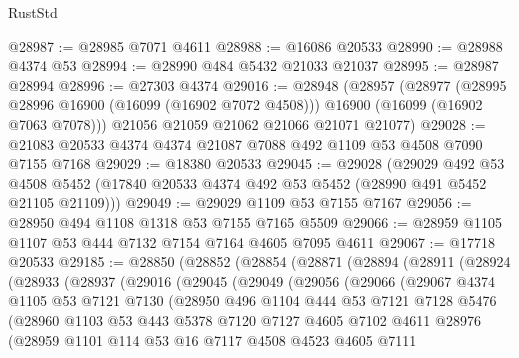 \begin{lexlean}{RustStd}
\begin{coremodule}
@28987 := @28985 @7071 @4611
@28988 := @16086 @20533
@28990 := @28988 @4374 @53
@28994 := @28990 @484 @5432 @21033 @21037
@28995 := @28987 @28994
@28996 := @27303 @4374
@29016 := @28948
    (@28957
      (@28977
        (@28995 @28996 @16900 (@16099 (@16902 @7072 @4508)))
        @16900
        (@16099 (@16902 @7063 @7078)))
      @21056
      @21059
      @21062
      @21066
      @21071
      @21077)
@29028 := @21083 @20533 @4374 @4374 @21087 @7088 @492 @1109 @53 @4508 @7090 @7155 @7168
@29029 := @18380 @20533
@29045 := @29028
    (@29029
      @492
      @53
      @4508
      @5452
      (@17840 @20533 @4374 @492 @53 @5452 (@28990 @491 @5452 @21105 @21109)))
@29049 := @29029 @1109 @53 @7155 @7167
@29056 := @28950 @494 @1108 @1318 @53 @7155 @7165 @5509
@29066 := @28959 @1105 @1107 @53 @444 @7132 @7154 @7164 @4605 @7095 @4611
@29067 := @17718 @20533
@29185 := @28850
    (@28852
      (@28854
        (@28871
          (@28894
            (@28911
              (@28924
                (@28933
                  (@28937
                    (@29016
                      (@29045
                        (@29049
                          (@29056
                            (@29066
                              (@29067
                                @4374
                                @1105
                                @53
                                @7121
                                @7130
                                (@28950
                                  @496
                                  @1104
                                  @444
                                  @53
                                  @7121
                                  @7128
                                  @5476
                                  (@28960
                                    @1103
                                    @53
                                    @443
                                    @5378
                                    @7120
                                    @7127
                                    @4605
                                    @7102
                                    @4611
                                    @28976
                                    (@28959
                                      @1101
                                      @114
                                      @53
                                      @16
                                      @7117
                                      @4508
                                      @4523
                                      @4605
                                      @7111

\end{coremodule}
\end{lexlean}
